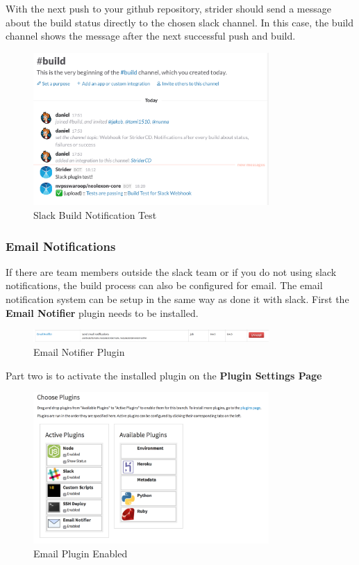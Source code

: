 With the next push to your github repository, strider should send a message about the build status directly to the chosen slack channel.
In this case, the build channel shows the message after the next successful push and build.

\begin{figure}[h!]
  \centering
  \includegraphics[width=0.8\textwidth]{images/slack_buildtest.png}
  \caption{Slack Build Notification Test}
\end{figure}

\subsubsection{Email Notifications}
If there are team members outside the slack team or if you do not using slack notifications, the build process can also be configured
for email. The email notification system can be setup in the same way as done it with slack. First the \textbf{Email Notifier}
plugin needs to be installed.

\begin{figure}[h!]
  \centering
  \includegraphics[width=0.8\textwidth]{images/email_notifier.png}
  \caption{Email Notifier Plugin}
\end{figure}

Part two is to activate the installed plugin on the \textbf{Plugin Settings Page}

\begin{figure}[h!]
  \centering
  \includegraphics[width=0.8\textwidth]{images/email_active.png}
  \caption{Email Plugin Enabled}
\end{figure}

